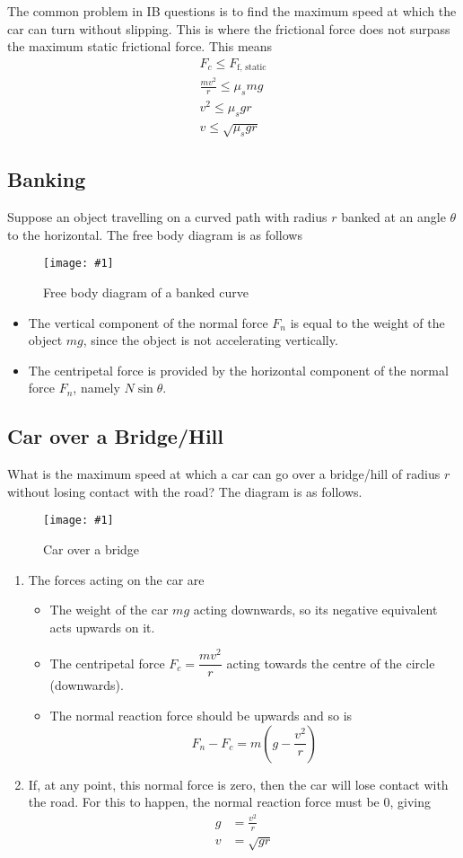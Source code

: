 \documentclass[a4paper,12pt]{article}
\newcommand{\img}[4]{\begin{center}
  \begin{figure}[H]
    \centering
    \texttt{[image: \#1]}
    \caption{#3}
    \label{fig:#4}
  \end{figure}
\end{center}}
\begin{document}
The common problem in IB questions is to find the maximum speed at which the car can turn without slipping. This is where the frictional force does not surpass the maximum static frictional force. This means
\begin{align*}
  F_c \le F_\text{f, static}  \\
  \frac{mv^2}{r} \le \mu_s mg \\
  v^2 \le \mu_s g r           \\
  v \le \sqrt{\mu_s g r}
\end{align*}

\pagebreak

\subsection{Banking}

Suppose an object travelling on a curved path with radius $r$ banked at an angle $\theta$ to the horizontal. The free body diagram is as follows
\img{material/banking.png}{0.4}{Free body diagram of a banked curve}{banking}
\begin{itemize}
  \item The vertical component of the normal force $F_n$ is equal to the weight of the object $mg$, since the object is not accelerating vertically.
  \item The centripetal force is provided by the horizontal component of the normal force $F_n$, namely $N \sin \theta$.
\end{itemize}

\pagebreak

\subsection{Car over a Bridge/Hill}

What is the maximum speed at which a car can go over a bridge/hill of radius $r$ without losing contact with the road? The diagram is as follows.

\img{material/bridge.png}{0.4}{Car over a bridge}{bridge}
\begin{enumerate}
  \item The forces acting on the car are
        \begin{itemize}
          \item The weight of the car $mg$ acting downwards, so its negative equivalent acts upwards on it.
          \item The centripetal force $F_c = \dfrac{mv^2}{r}$ acting towards the centre of the circle (downwards).
          \item The normal reaction force should be upwards and so is $$F_n - F_c = m\left(g - \frac{v^2}{r}\right)$$
        \end{itemize}
  \item If, at any point, this normal force is zero, then the car will lose contact with the road. For this to happen, the normal reaction force must be $0$, giving
        \begin{align*}
          g & = \frac{v^2}{r} \\
          v & = \sqrt{gr}
        \end{align*}
\end{enumerate}
\end{document}
